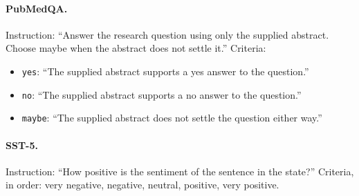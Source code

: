 \paragraph{PubMedQA.} Instruction: ``Answer the research question using only the
supplied abstract. Choose maybe when the abstract does not settle it.''
Criteria:
\begin{itemize}
  \item \texttt{yes}: ``The supplied abstract supports a yes answer to the
  question.''
  \item \texttt{no}: ``The supplied abstract supports a no answer to the
  question.''
  \item \texttt{maybe}: ``The supplied abstract does not settle the question
  either way.''
\end{itemize}

\paragraph{SST-5.} Instruction: ``How positive is the sentiment of the sentence
in the state?'' Criteria, in order: very negative, negative, neutral, positive,
very positive.

